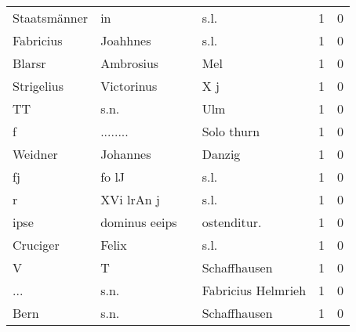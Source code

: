 \begin{center}
\begin{tiny}
\begin{longtabu}{llllrr}
             Staatsmänner &                                 in &             &                                        s.l. &          1 &         0 \\
                Fabricius &                           Joahhnes &             &                                        s.l. &          1 &         0 \\
                   Blarsr &                          Ambrosius &             &                                         Mel &          1 &         0 \\
               Strigelius &                         Victorinus &             &                                         X j &          1 &         0 \\
                       TT &                               s.n. &             &                                         Ulm &          1 &         0 \\
                        f &                           ........ &             &                                  Solo thurn &          1 &         0 \\
                  Weidner &                           Johannes &             &                                      Danzig &          1 &         0 \\
                       fj &                              fo lJ &             &                                        s.l. &          1 &         0 \\
                        r &                         XVi lrAn j &             &                                        s.l. &          1 &         0 \\
                     ipse &                      dominus eeips &             &                                ostenditur.  &          1 &         0 \\
                 Cruciger &                              Felix &             &                                        s.l. &          1 &         0 \\
                        V &                                  T &             &                                Schaffhausen &          1 &         0 \\
                      ... &                               s.n. &             &                          Fabricius Helmrieh &          1 &         0 \\
                     Bern &                               s.n. &             &                                Schaffhausen &          1 &         0 \\

\end{longtabu}
\end{tiny}
\end{center}
